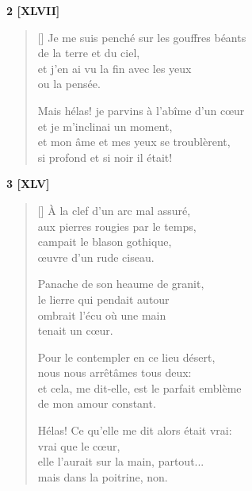 \documentclass[a4paper,12pt]{book}
\begin{document}
\bigskip

\begin{center}
  \textbf{2 [XLVII]}
\end{center}

\settowidth{\versewidth}{Mais hélas! je parvins à l'abîme d'un cœur}

\begin{verse}[\versewidth]
  Je me suis penché sur les gouffres béants \\
  de la terre et du ciel, \\
  et j'en ai vu la fin avec les yeux \\
  ou la pensée.

  Mais hélas! je parvins à l'abîme d'un cœur \\
  et je m'inclinai un moment, \\
  et mon âme et mes yeux se troublèrent, \\
  si profond et si noir il était!
\end{verse}

\bigskip

\begin{center}
  \textbf{3 [XLV]}
\end{center}

\settowidth{\versewidth}{et cela, me dit-elle, est le parfait emblème}

\begin{verse}[\versewidth]
  À la clef d'un arc mal assuré, \\
  aux pierres rougies par le temps, \\
  campait le blason gothique, \\
  œuvre d'un rude ciseau.

  Panache de son heaume de granit, \\
  le lierre qui pendait autour \\
  ombrait l'écu où une main \\
  tenait un cœur.

  Pour le contempler en ce lieu désert, \\
  nous nous arrêtâmes tous deux: \\
  et cela, me dit-elle, est le parfait emblème \\
  de mon amour constant.

  Hélas! Ce qu'elle me dit alors était vrai: \\
  vrai que le cœur, \\
  elle l'aurait sur la main, partout... \\
  mais dans la poitrine, non.
\end{verse}
\end{document}
